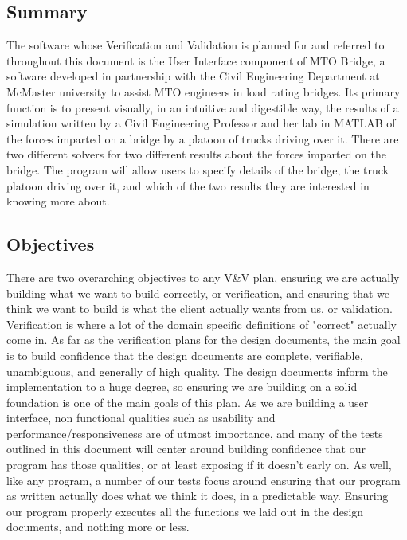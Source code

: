 \documentclass[12pt, titlepage]{article}
\begin{document}
\subsection{Summary}

The software whose Verification and Validation is planned for and referred to throughout this document is the User Interface component of MTO Bridge, 
a software developed in partnership with the Civil Engineering Department at McMaster university to assist MTO engineers in load rating bridges.
Its primary function is to present visually, in an intuitive and digestible way, the results of a simulation written by a Civil Engineering Professor and her lab 
in MATLAB of the forces imparted on a bridge by a platoon of trucks driving over it. There are two different solvers for two different results about the forces 
imparted on the bridge. The program will allow users to specify details of the bridge, the truck platoon driving over it, and which of the two results they are 
interested in knowing more about.\\

\subsection{Objectives}

There are two overarching objectives to any V\&V plan, ensuring we are actually building what we want to build correctly, or verification,
and ensuring that we think we want to build is what the client actually wants from us, or validation. Verification is where a lot of the domain specific definitions
of "correct" actually come in. As far as the verification plans for the design documents, the main goal is to build confidence that the design documents are complete,
verifiable, unambiguous, and generally of high quality. The design documents inform the implementation to a huge degree, so ensuring we are building on a solid foundation
is one of the main goals of this plan. As we are building a user interface, non functional qualities such as usability and performance/responsiveness are of 
utmost importance, and many of the tests outlined in this document will center around building confidence that our program has those qualities, or at least 
exposing if it doesn't early on. As well, like any program, a number of our tests focus around ensuring that our program as written actually does what we think it does,
in a predictable way. Ensuring our program properly executes all the functions we laid out in the design documents, and nothing more or less.\\
\end{document}
